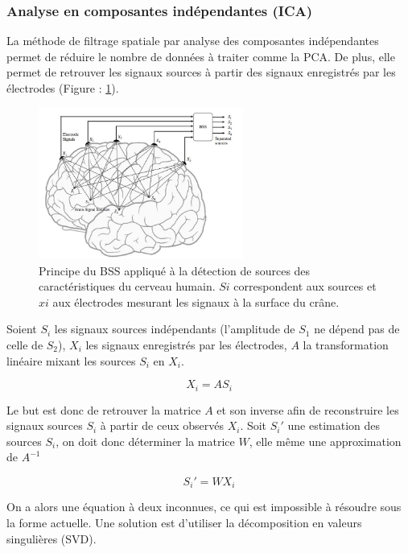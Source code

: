 \subsubsection{Analyse en composantes indépendantes (ICA)}
\label{Subsecton : 4.ICA}
La méthode de filtrage spatiale par analyse des composantes indépendantes permet de réduire le nombre de données à traiter comme la PCA. De plus, elle permet de retrouver les signaux sources à partir des signaux enregistrés par les électrodes\cite{ICA} (Figure : \ref{conceptBSS}). 

\begin{figure}[h]
	\centering\includegraphics[width=0.6\textwidth]{images/conceptBSS.jpg}
	\caption[ICA et principe du BSS]{Principe du BSS appliqué à la détection de sources des caractéristiques du cerveau humain. $Si$ correspondent aux sources et $xi$ aux électrodes mesurant les signaux à la surface du crâne.\cite{Saeid}}
	\label{conceptBSS}
\end{figure}

Soient $S_i$ les signaux sources indépendants (l'amplitude de $S_1$ ne dépend pas de celle de $S_2$), $X_i$ les signaux enregistrés par les électrodes, $A$ la transformation linéaire mixant les sources $S_i$ en $X_i$.

\begin{equation}
X_i = AS_i
\end{equation}

 Le but est donc de retrouver la matrice $A$ et son inverse afin de reconstruire les signaux sources $S_i$ à partir de ceux observés $X_i$. Soit $S_i'$ une estimation des sources $S_i$, on doit donc déterminer la matrice $W$, elle même une approximation de $A^{-1}$

 \begin{equation}
 S_i' = WX_i
 \end{equation}

On a alors une équation à deux inconnues, ce qui est impossible à résoudre sous la forme actuelle. Une solution est d'utiliser la décomposition en valeurs singulières (SVD). 

